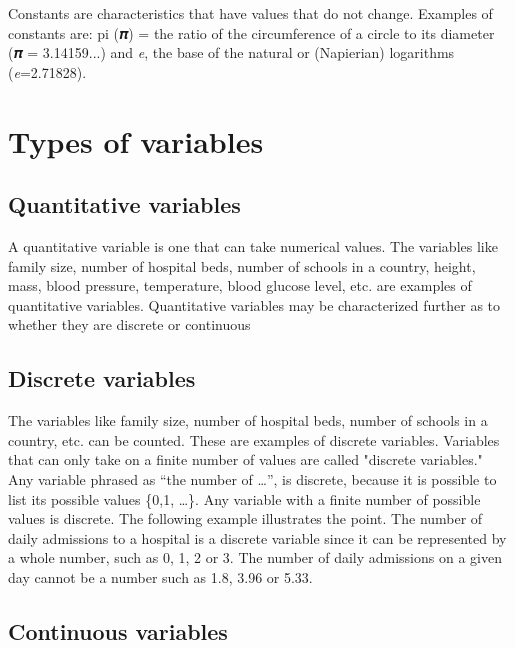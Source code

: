 \documentclass[
]{book}
\begin{document}
Constants are characteristics that have values that do not change. Examples of constants are: pi (𝝅) = the ratio of the circumference of a circle to its diameter (𝝅 = 3.14159...) and \emph{e}, the base of the natural or (Napierian) logarithms (\emph{e}=2.71828).

\hypertarget{types-of-variables}{%
\section{Types of variables}\label{types-of-variables}}

\hypertarget{quantitative-variables}{%
\subsection{Quantitative variables}\label{quantitative-variables}}

A quantitative variable is one that can take numerical values. The variables like family size, number of hospital beds, number of schools in a country, height, mass, blood pressure, temperature, blood glucose level, etc. are examples of quantitative variables. Quantitative variables may be characterized further as to whether they
are discrete or continuous

\hypertarget{discrete-variables}{%
\subsection{Discrete variables}\label{discrete-variables}}

The variables like family size, number of hospital beds, number of schools in a country, etc. can be counted. These are examples of discrete variables. Variables that can only take on a finite number of values are called "discrete variables." Any variable phrased as ``the number of \ldots{}'', is discrete, because it is possible to list its possible
values \{0,1, \ldots\}. Any variable with a finite number of possible values is discrete. The following example illustrates the point. The number of daily admissions to a hospital is a discrete variable since it can be represented by a whole number, such as 0, 1, 2 or 3. The number of daily
admissions on a given day cannot be a number such as 1.8, 3.96 or 5.33.

\hypertarget{continuous-variables}{%
\subsection{Continuous variables}\label{continuous-variables}}
\end{document}
